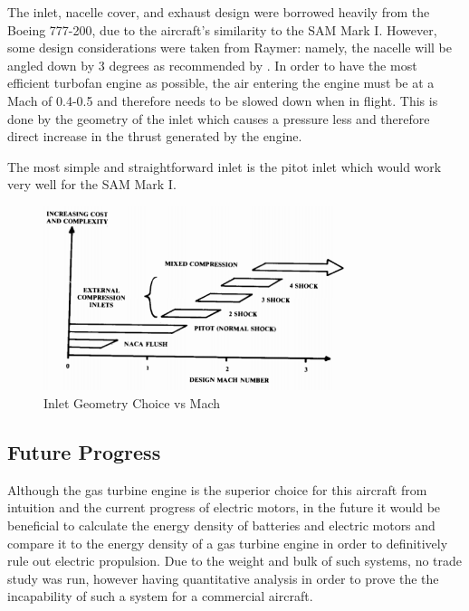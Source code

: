 The inlet, nacelle cover, and exhaust design were borrowed heavily from the Boeing 777-200, due to the aircraft's similarity to the SAM Mark I. However, some design considerations were taken from Raymer: namely, the nacelle will be angled down by 3 degrees as recommended by \cite{raymer}. In order to have the most efficient turbofan engine as possible, the air entering the engine must be at a Mach of 0.4-0.5 and therefore needs to be slowed down when in flight. This is done by the geometry of the inlet which causes a pressure less and therefore direct increase in the thrust generated by the engine. 

The most simple and straightforward inlet is the pitot inlet which would work very well for the SAM Mark I.

\begin{figure} [h!]
    \centering
    \includegraphics[width=0.8\textwidth]{Photos/inletapplicability.PNG}
    \caption{Inlet Geometry Choice vs Mach}
    \label{fig:inlet}
\end{figure}


\subsection{Future Progress}

Although the gas turbine engine is the superior choice for this aircraft from intuition and the current progress of electric motors, in the future it would be beneficial to calculate the energy density of batteries and electric motors and compare it to the energy density of a gas turbine engine in order to definitively rule out electric propulsion. Due to the weight and bulk of such systems, no trade study was run, however having quantitative analysis in order to prove the the incapability of such a system for a commercial aircraft.

